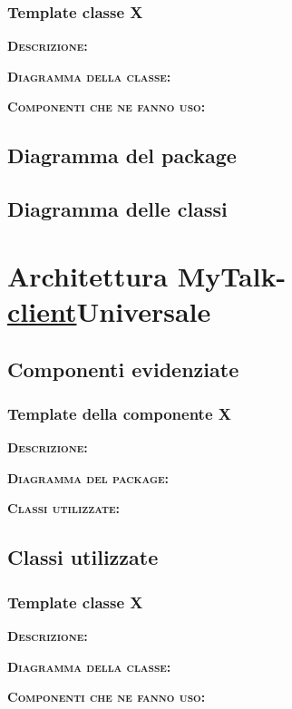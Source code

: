 \subsubsection{Template classe X}
\begin{description}
	\item{\scshape\bfseries Descrizione:} 
	\item{\scshape\bfseries Diagramma della classe:}
	\item{\scshape\bfseries Componenti che ne fanno uso:} 
\end{description}

\subsection{Diagramma del package}

\subsection{Diagramma delle classi}
\clearpage

\section{Architettura MyTalk-\underline{client}Universale}

\subsection{Componenti evidenziate}

\subsubsection{Template della componente X}
\begin{description}
	\item{\scshape\bfseries Descrizione:} 
	\item{\scshape\bfseries Diagramma del package:}
	\item{\scshape\bfseries Classi utilizzate:} 
\end{description}

\subsection{Classi utilizzate}

\subsubsection{Template classe X}
\begin{description}
	\item{\scshape\bfseries Descrizione:} 
	\item{\scshape\bfseries Diagramma della classe:}
	\item{\scshape\bfseries Componenti che ne fanno uso:} 
\end{description}

